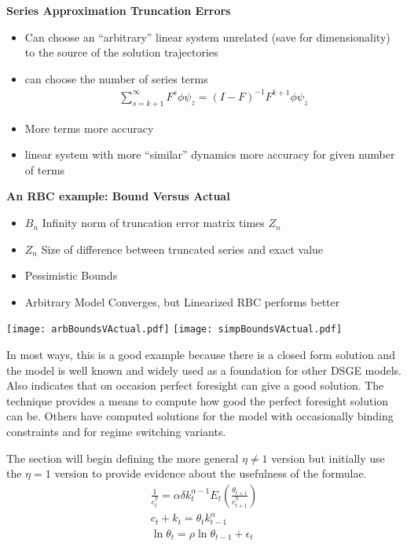 \documentclass[12pt]{article}
\begin{document}
{\bf Series Approximation Truncation Errors}

  \begin{itemize}
  \item Can choose an ``arbitrary''  linear system unrelated (save for dimensionality) to the source of the solution trajectories
  \item can choose the number of series terms
    \begin{gather}
      \label{eq:1}
\sum_{s=k+1}^{\infty} F^s \phi \psi_z = (I -F)^{-1} F^{k+1}\phi \psi_z       
    \end{gather}
  \item More terms more accuracy
  \item linear system with more ``similar'' dynamics more accuracy for given number of terms
  \end{itemize}



{\bf An RBC example: Bound Versus Actual}
  \begin{itemize}
  \item $B_n$ Infinity norm of truncation error matrix times $Z_n$
  \item $Z_n$ Size of difference between truncated series and exact value
  \item Pessimistic Bounds
  \item Arbitrary Model Converges, but Linearized RBC performs better
  \end{itemize}
 \texttt{[image: arbBoundsVActual.pdf]}
 \texttt{[image: simpBoundsVActual.pdf]}


In most ways, this is a good example because there is a closed form solution
and the model is well known and widely used as a foundation for other DSGE
models.
Also indicates that on occasion perfect foresight can give a good solution.
The technique provides a means to compute how good the perfect foresight solution can be.
Others have computed solutions for the model with occasionally binding constraints and for regime switching variants.



The section will begin defining the more general $\eta \ne 1$ version but
initially use the $\eta=1$ version to provide evidence 
about the usefulness of the
formulae.
\begin{gather}
\frac{1}{c_t^{\eta}}=\alpha \delta k_{t}^{\alpha-1} E_t \left (\frac{\theta_{t+1}}{c_{t+1}^\eta} \right ) \\
c_t + k_t=\theta_tk_{t-1}^\alpha \\
\ln \theta_t =\rho \ln \theta_{t-1} + \epsilon_t\label{rbcSys}
\end{gather}
\end{document}
